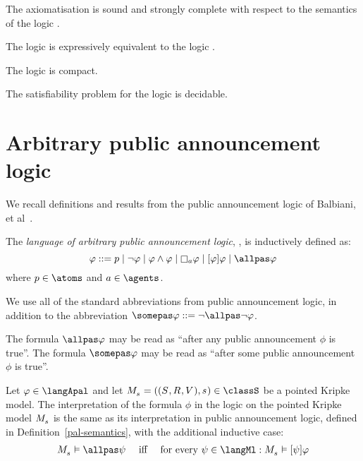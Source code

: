 \begin{proposition}
The axiomatisation \axiomPalS{} is sound and strongly complete with respect to the semantics of the logic \logicPalS{}.
\end{proposition}

\begin{proposition}
The logic \logicPalS{} is expressively equivalent to the logic \logicS{}.
\end{proposition}

\begin{proposition}
The logic \logicPalS{} is compact.
\end{proposition}

\begin{proposition}
The satisfiability problem for the logic \logicPalS{} is decidable.
\end{proposition}

\section{Arbitrary public announcement logic}\label{apal}

We recall definitions and results from the public announcement logic of Balbiani, et al~\cite{balbiani:2008}.

\begin{definition}
The {\em language of arbitrary public announcement logic}, \langApal{}, is inductively defined as:
$$
\phi ::= 
    \atomP \mid
    \lnot \phi \mid
    \phi \land \phi \mid
    \necessaryA \phi \mid
    \announceA{\phi} \phi \mid
    \allpas \phi
$$
where $\atomP \in \atoms$ and $\agentA \in \agents$.
\end{definition}

We use all of the standard abbreviations from public announcement logic, in addition to the abbreviation $\somepas \phi ::= \lnot \allpas \lnot \phi$.

The formula $\allpas \phi$ may be read as ``after any public announcement $\phi$ is true''.
The formula $\somepas \phi$ may be read as ``after some public announcement $\phi$ is true''.

\begin{definition}
Let $\phi \in \langApal$ and let $\kPModelAndTuple{\kStateS} \in \classS$ be a pointed Kripke model.
The interpretation of the formula $\phi$ in the logic \logicApalS{} on the pointed Kripke model $\kPModel{\kStateS}$ is the same as its interpretation in public announcement logic, defined in Definition~\ref{pal-semantics}, with the additional inductive case:
$$
\begin{array}{lcl}
    \kPModel{\kStateS} \entails \allpas \psi & \text{ iff } & \text{for every } \psi \in \langMl : \kPModel{\kStateS} \entails \announceA{\psi} \phi
\end{array}
$$
\end{definition}

